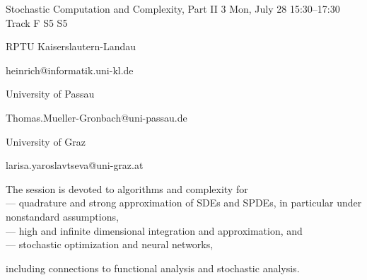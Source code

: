 \begin{talk}
\begin{comment}
Equations may be used if they are referenced. Please note that the equation numbers may be different (but will be cross-referenced correctly) in the final program book.
\end{comment}
\end{talk}

\begin{talk}
  {Stochastic Computation and Complexity, Part II}%
  {3}%
  {}%
  {}%
  {}%
  {}%
  {Mon, July 28 15:30–17:30 Track F}%
  {S5}%
  {S5}%


  {%


	{RPTU Kaiserslautern-Landau}%


	{heinrich@informatik.uni-kl.de}}%


 {%


{University of Passau}%


    {Thomas.Mueller-Gronbach@uni-passau.de}}%


  {%


	{University of Graz}%


	{larisa.yaroslavtseva@uni-graz.at}}%





The session is devoted to algorithms and complexity for\\





--- quadrature and strong approximation of SDEs and SPDEs, in particular under nonstandard assumptions,\\





--- high and infinite dimensional integration and approximation, and\\





--- stochastic optimization and neural networks,





including connections to functional analysis and stochastic analysis.









\end{talk}
